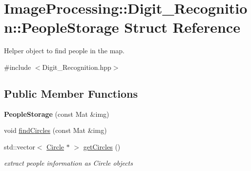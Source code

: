 \hypertarget{struct_image_processing_1_1_digit___recognition_1_1_people_storage}{}\section{Image\+Processing\+:\+:Digit\+\_\+\+Recognition\+:\+:People\+Storage Struct Reference}
\label{struct_image_processing_1_1_digit___recognition_1_1_people_storage}


Helper object to find people in the map.  




{\ttfamily \#include $<$Digit\+\_\+\+Recognition.\+hpp$>$}

\subsection*{Public Member Functions}
\begin{DoxyCompactItemize}
\item 
\mbox{\label{struct_image_processing_1_1_digit___recognition_1_1_people_storage_a3c0c2d32c1261b83fe7b059e8d6824b6}} 
{\bfseries People\+Storage} (const Mat \&img)
\item 
void \mbox{\hyperlink{struct_image_processing_1_1_digit___recognition_1_1_people_storage_abf497a9ec4f06a14df057e6b94066ed2}{find\+Circles}} (const Mat \&img)
\item 
\mbox{\label{struct_image_processing_1_1_digit___recognition_1_1_people_storage_a3d3ac1f8f420e883bd152ab15964524c}} 
std\+::vector$<$ \mbox{\hyperlink{class_geometry2_d_1_1_circle}{Circle}} $\ast$ $>$ \mbox{\hyperlink{struct_image_processing_1_1_digit___recognition_1_1_people_storage_a3d3ac1f8f420e883bd152ab15964524c}{get\+Circles}} ()
\begin{DoxyCompactList}\small\item\em extract people information as Circle objects \end{DoxyCompactList}\end{DoxyCompactItemize}
